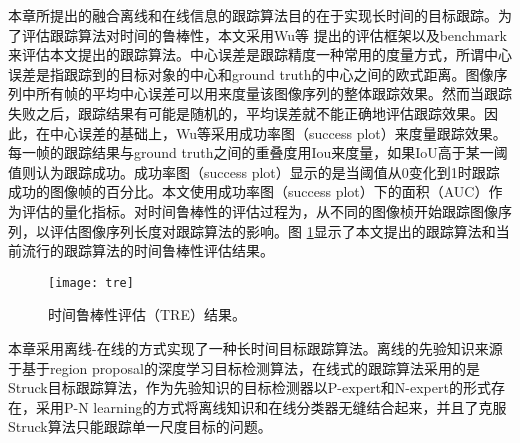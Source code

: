本章所提出的融合离线和在线信息的跟踪算法目的在于实现长时间的目标跟踪。为了评估跟踪算法对时间的鲁棒性，本文采用Wu等 \cite{benchmark}提出的评估框架以及benchmark来评估本文提出的跟踪算法。中心误差是跟踪精度一种常用的度量方式，所谓中心误差是指跟踪到的目标对象的中心和ground truth的中心之间的欧式距离。图像序列中所有帧的平均中心误差可以用来度量该图像序列的整体跟踪效果。然而当跟踪失败之后，跟踪结果有可能是随机的，平均误差就不能正确地评估跟踪效果。因此，在中心误差的基础上，Wu等采用成功率图（success plot）来度量跟踪效果。每一帧的跟踪结果与ground truth之间的重叠度用Iou来度量，如果IoU高于某一阈值则认为跟踪成功。成功率图（success plot）显示的是当阈值从0变化到1时跟踪成功的图像帧的百分比。本文使用成功率图（success plot）下的面积（AUC）作为评估的量化指标。对时间鲁棒性的评估过程为，从不同的图像桢开始跟踪图像序列，以评估图像序列长度对跟踪算法的影响。图 \ref{fig:tre}显示了本文提出的跟踪算法和当前流行的跟踪算法的时间鲁棒性评估结果。
\begin{figure}
	\centering
	\texttt{[image: tre]}
	\caption{时间鲁棒性评估（TRE）结果。}
	\label{fig:tre}
\end{figure}

本章采用离线-在线的方式实现了一种长时间目标跟踪算法。离线的先验知识来源于基于region proposal的深度学习目标检测算法，在线式的跟踪算法采用的是Struck目标跟踪算法，作为先验知识的目标检测器以P-expert和N-expert的形式存在，采用P-N learning的方式将离线知识和在线分类器无缝结合起来，并且了克服Struck算法只能跟踪单一尺度目标的问题。